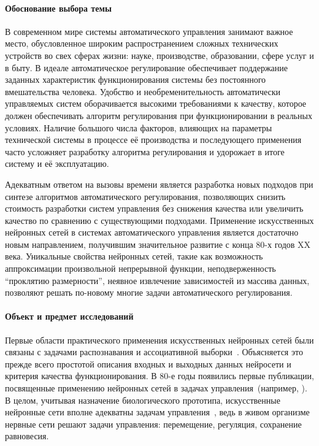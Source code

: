 
\paragraph{Обоснование выбора темы}

В современном мире системы автоматического управления занимают важное
место, обусловленное широким распространением сложных технических
устройств во свех сферах жизни: науке, производстве, образовании,
сфере услуг и в быту.  В идеале автоматическое регулирование
обеспечивает поддержание заданных характеристик функционирования
системы без постоянного вмешательства человека.  Удобство и
необременительность автоматически управляемых систем оборачивается
высокими требованиями к качеству, которое должен обеспечивать алгоритм
регулирования при функционировании в реальных условиях.  Наличие
большого числа факторов, влияющих на параметры технической системы в
процессе её производства и последующего применения часто усложняет
разработку алгоритма регулирования и удорожает в итоге систему и её
эксплуатацию.

Адекватным ответом на вызовы времени является разработка новых
подходов при синтезе алгоритмов автоматического регулирования,
позволяющих снизить стоимость разработки систем управления без
снижения качества или увеличить качество по сравнению с существующими
подходами.  Применение искусственных нейронных сетей в системах
автоматического управления является достаточно новым направлением,
получившим значительное развитие с конца 80-х годов XX века.
Уникальные свойства нейронных сетей, такие как возможность
аппроксимации произвольной непрерывной функции, неподверженность
``проклятию размерности'', неявное извлечение зависимостей из массива
данных, позволяют решать по-новому многие задачи автоматического
регулирования.

\paragraph{Объект и предмет исследований}


Первые области практического применения искусственных нейронных сетей
были связаны с задачами распознавания и ассоциативной
выборки~\cite{wasser92,koh80,gal74}.  Объясняется это прежде всего
простотой описания входных и выходных данных нейросети и критерия
качества функционирования.  В 80-е годы появились первые публикации,
посвященные применению нейронных сетей в задачах управления~(например,
\cite{barto83}).  В целом, учитывая назначение биологического
прототипа, искусственные нейронные сети вполне адекватны задачам
управления~\cite{bondlog97}, ведь в живом организме нервные сети
решают задачи управления: перемещение, регуляция, сохранение
равновесия.

